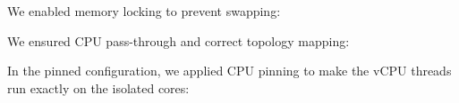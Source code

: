 We enabled memory locking to prevent swapping:

\begin{Shaded}
\begin{Highlighting}[]
\end{Highlighting}
\end{Shaded}

We ensured CPU pass-through and correct topology mapping:

\begin{Shaded}
\begin{Highlighting}[]
\KeywordTok{\textgreater{}}
  \StringTok{\textquotesingle{}1\textquotesingle{}}\StringTok{\textquotesingle{}1\textquotesingle{}}\StringTok{\textquotesingle{}2\textquotesingle{}}\StringTok{\textquotesingle{}1\textquotesingle{}}\KeywordTok{/\textgreater{}}
\end{Highlighting}
\end{Shaded}

In the pinned configuration, we applied CPU pinning to make the vCPU
threads run exactly on the isolated cores:

\begin{Shaded}
\begin{Highlighting}[]
\KeywordTok{\textgreater{}}
  \StringTok{\textquotesingle{}0\textquotesingle{}}\StringTok{\textquotesingle{}22\textquotesingle{}}\KeywordTok{/\textgreater{}}
  \StringTok{\textquotesingle{}1\textquotesingle{}}\StringTok{\textquotesingle{}23\textquotesingle{}}\KeywordTok{/\textgreater{}} 
  \KeywordTok{/\textgreater{}}
  \StringTok{\textquotesingle{}1\textquotesingle{}}\KeywordTok{/\textgreater{}}
\end{Highlighting}
\end{Shaded}

